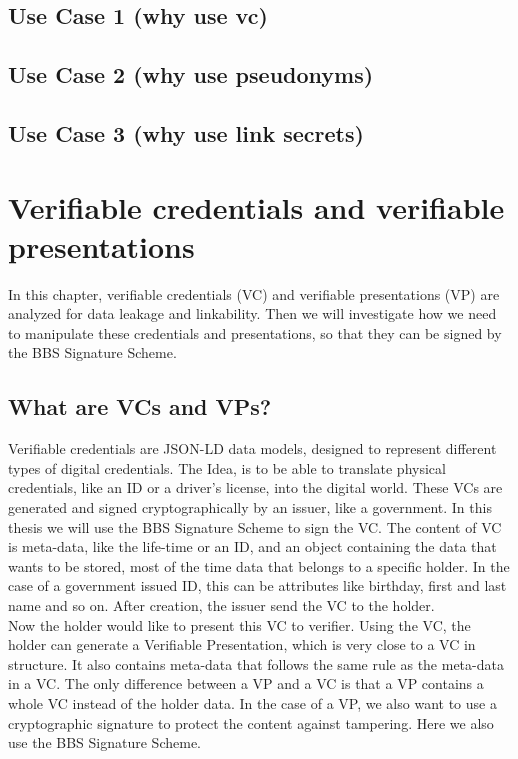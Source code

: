 \documentclass[
	a4paper               %
	,BCOR=0mm            %
	,bibliography=totoc   %
	,listof=totoc         %
	,monolingual
	,twoside=false
]{bfhthesis}              %
\begin{document}
\section{Use Case 1 (why use vc)}

\section{Use Case 2 (why use pseudonyms)}

\section{Use Case 3 (why use link secrets)}


\chapter{Verifiable credentials and verifiable presentations}
\label{chap:vpnvc}
In this chapter, verifiable credentials (VC) and verifiable presentations (VP) are analyzed for data leakage and linkability.
Then we will investigate how we need to manipulate these credentials and presentations, so that they can be signed by the BBS Signature Scheme.

\section{What are VCs and VPs?}
Verifiable credentials\cite{verifiable-credentials} are JSON-LD data models, designed to represent different types of digital credentials.
The Idea, is to be able to translate physical credentials, like an ID or a driver's license, into the digital world.
These VCs are generated and signed cryptographically by an issuer, like a government.
In this thesis we will use the BBS Signature Scheme to sign the VC.
The content of VC is meta-data, like the life-time or an ID, and an object containing the data that wants to be stored, most of the time data that belongs to a specific holder.
In the case of a government issued ID, this can be attributes like birthday, first and last name and so on.
After creation, the issuer send the VC to the holder.\\

Now the holder would like to present this VC to verifier.
Using the VC, the holder can generate a Verifiable Presentation\cite{verifiable-credentials}, which is very close to a VC in structure.
It also contains meta-data that follows the same rule as the meta-data in a VC.
The only difference between a VP and a VC is that a VP contains a whole VC instead of the holder data.
In the case of a VP, we also want to use a cryptographic signature to protect the content against tampering. Here we also use the BBS Signature Scheme.\\
\end{document}
